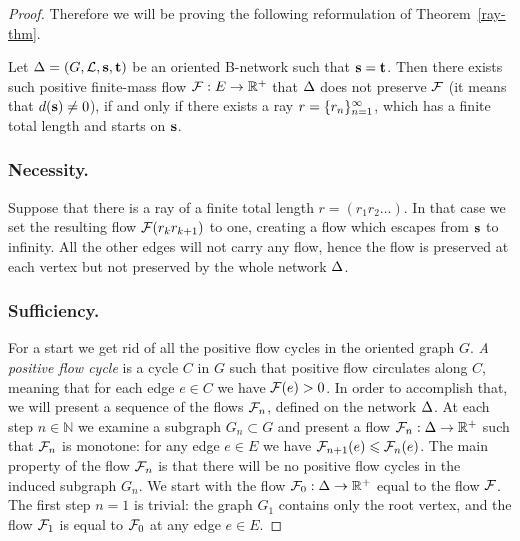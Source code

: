 \documentclass[12pt]{amsart}
\begin{document}
\begin{proof}
      Therefore we will be proving the following reformulation of Theorem~\ref{ray-thm}.
      \begin{theorem*}
        Let $\Delta = (G, \mathcal{L}, \mathbf{s}, \mathbf{t})$ be an oriented B-network such that $\mathbf{s} = \mathbf{t}$.
        Then there exists such positive finite-mass flow $\mathcal{F}: E \to \mathbb{R}^{+}$ that
          $\Delta$ does not preserve $\mathcal{F}$ (it means that $d(\mathbf{s}) \neq 0$),
          if and only if there exists a ray $r = \{{r}_n\}_{n=1}^\infty$, which has a finite total length and starts on $\mathbf{s}$.
      \end{theorem*}
      \subsubsection*{Necessity.}
      Suppose that there is a ray of a finite total length $r=(r_1 r_2 \dots)$.
      In that case we set the resulting flow $\mathcal{F}(r_k r_{k+1})$ to one, creating a flow which escapes
        from $\mathbf{s}$ to infinity.
      All the other edges will not carry any flow, hence the flow is preserved
        at each vertex but not preserved by the whole network $\Delta$.
      \subsubsection*{Sufficiency.}
      For a start we get rid of all the positive flow cycles in the oriented graph $G$.
      \emph{A positive flow cycle} is a cycle $C$ in $G$ such that positive flow circulates along $C$,
        meaning that for each edge $e \in C$ we have $\mathcal{F}(e) > 0$.
      In order to accomplish that, we will present a sequence of the flows $\mathcal{F}_{n}$, defined on the network $\Delta$.
      At each step $n \in \mathbb{N}$ we examine a subgraph $G_n \subset G$ and present a flow $\mathcal{F}_{n}: \Delta \to \mathbb{R}^{+}$
        such that $\mathcal{F}_{n}$ is monotone: for any edge $e \in E$ we have $\mathcal{F}_{n+1}(e) \leqslant \mathcal{F}_{n}(e)$.
      The main property of the flow $\mathcal{F}_{n}$ is that there will be no positive flow cycles in the induced subgraph
      $G_n$.
      We start with the flow $\mathcal{F}_{0}:\Delta \to \mathbb{R}^+$ equal to the flow $\mathcal{F}$.
      The first step $n = 1$ is trivial: the graph $G_1$ contains only the root vertex, and
        the flow $\mathcal{F}_{1}$ is equal to $\mathcal{F}_{0}$ at any edge $e \in E$.


\end{proof}
\end{document}
